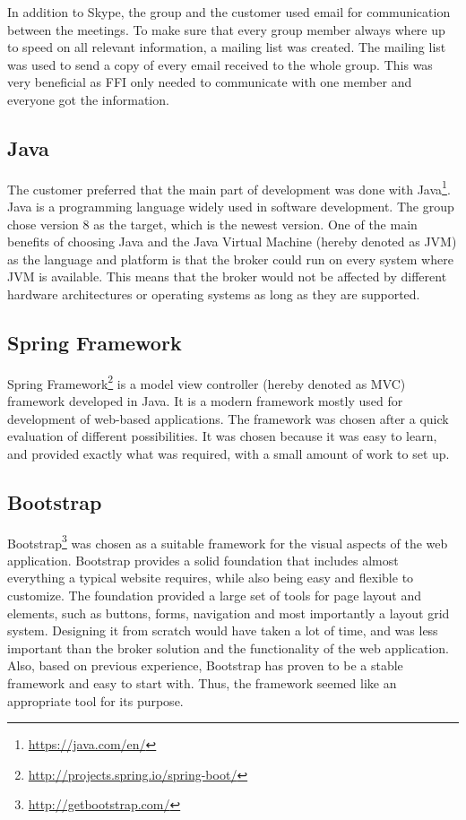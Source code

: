 In addition to Skype, the group and the customer used email for communication between the meetings. To make sure that every group member always where up to speed on all relevant information, a mailing list was created. The mailing list was used to send a copy of every email received to the whole group. This was very beneficial as FFI only needed to communicate with one member and everyone got the information.

\subsection{Java}
\label{subsec:prestudies-tools-java}

The customer preferred that the main part of development was done with Java\footnote{\url{https://java.com/en/}}. Java is a programming language widely used in software development. The group chose version 8 as the target, which is the newest version. One of the main benefits of choosing Java and the Java Virtual Machine (hereby denoted as JVM) as the language and platform is that the broker could run on every system where JVM is available. This means that the broker would not be affected by different hardware architectures or operating systems as long as they are supported.

\subsection{Spring Framework}
\label{subsec:prestudies-tools-spring_mvc}

Spring Framework\footnote{\url{http://projects.spring.io/spring-boot/}} is a model view controller (hereby denoted as MVC) framework developed in Java. It is a modern framework mostly used for development of web-based applications. The framework was chosen after a quick evaluation of different possibilities. It was chosen because it was easy to learn, and provided exactly what was required, with a small amount of work to set up.

\subsection{Bootstrap}
\label{subsec:prestudies-tools-bootstrap}

Bootstrap\footnote{\url{http://getbootstrap.com/}} was chosen as a suitable framework for the visual aspects of the web application. Bootstrap provides a solid foundation that includes almost everything a typical website requires, while also being easy and flexible to customize. The foundation provided a large set of tools for page layout and elements, such as buttons, forms, navigation and most importantly a layout grid system. Designing it from scratch would have taken a lot of time, and was less important than the broker solution and the functionality of the web application. Also, based on previous experience, Bootstrap has proven to be a stable framework and easy to start with. Thus, the framework seemed like an appropriate tool for its purpose.

